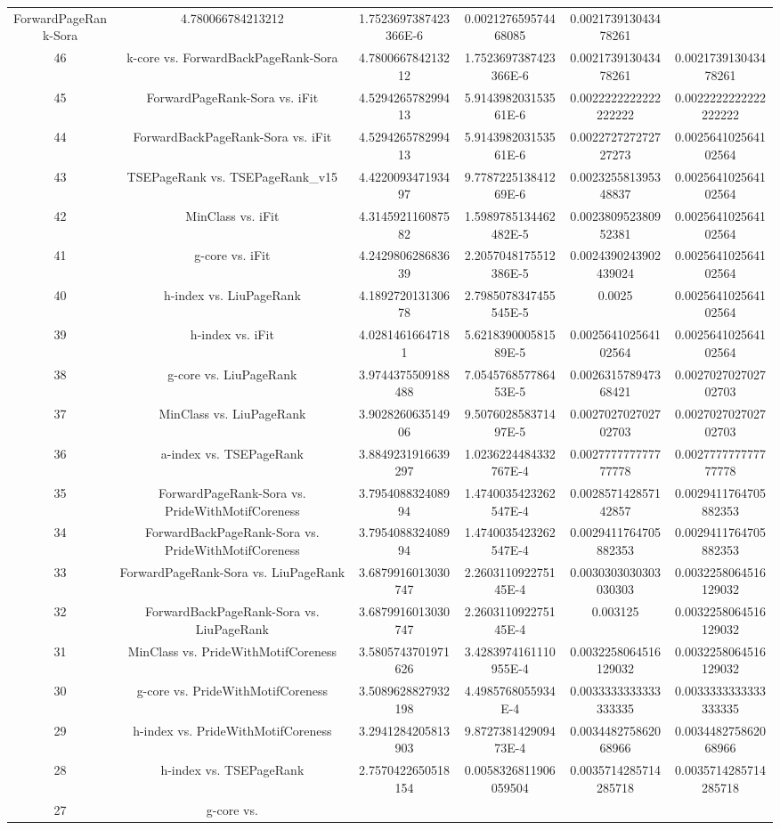 \documentclass[a4paper,10pt]{article}
\begin{document}
\begin{landscape}
\begin{table}[!htp]
\begin{tabular}{cccccc}
ForwardPageRank-Sora&4.780066784213212&1.7523697387423366E-6&0.002127659574468085&0.002173913043478261\\46&k-core vs. ForwardBackPageRank-Sora&4.780066784213212&1.7523697387423366E-6&0.002173913043478261&0.002173913043478261\\45&ForwardPageRank-Sora vs. iFit&4.529426578299413&5.914398203153561E-6&0.0022222222222222222&0.0022222222222222222\\44&ForwardBackPageRank-Sora vs. iFit&4.529426578299413&5.914398203153561E-6&0.002272727272727273&0.002564102564102564\\43&TSEPageRank vs. TSEPageRank_v15&4.422009347193497&9.778722513841269E-6&0.002325581395348837&0.002564102564102564\\42&MinClass vs. iFit&4.314592116087582&1.5989785134462482E-5&0.002380952380952381&0.002564102564102564\\41&g-core vs. iFit&4.242980628683639&2.2057048175512386E-5&0.0024390243902439024&0.002564102564102564\\40&h-index vs. LiuPageRank&4.189272013130678&2.7985078347455545E-5&0.0025&0.002564102564102564\\39&h-index vs. iFit&4.02814616647181&5.621839000581589E-5&0.002564102564102564&0.002564102564102564\\38&g-core vs. LiuPageRank&3.9744375509188488&7.054576857786453E-5&0.002631578947368421&0.002702702702702703\\37&MinClass vs. LiuPageRank&3.902826063514906&9.507602858371497E-5&0.002702702702702703&0.002702702702702703\\36&a-index vs. TSEPageRank&3.8849231916639297&1.0236224484332767E-4&0.002777777777777778&0.002777777777777778\\35&ForwardPageRank-Sora vs. PrideWithMotifCoreness&3.795408832408994&1.4740035423262547E-4&0.002857142857142857&0.0029411764705882353\\34&ForwardBackPageRank-Sora vs. PrideWithMotifCoreness&3.795408832408994&1.4740035423262547E-4&0.0029411764705882353&0.0029411764705882353\\33&ForwardPageRank-Sora vs. LiuPageRank&3.6879916013030747&2.260311092275145E-4&0.0030303030303030303&0.0032258064516129032\\32&ForwardBackPageRank-Sora vs. LiuPageRank&3.6879916013030747&2.260311092275145E-4&0.003125&0.0032258064516129032\\31&MinClass vs. PrideWithMotifCoreness&3.5805743701971626&3.4283974161110955E-4&0.0032258064516129032&0.0032258064516129032\\30&g-core vs. PrideWithMotifCoreness&3.5089628827932198&4.4985768055934E-4&0.0033333333333333335&0.0033333333333333335\\29&h-index vs. PrideWithMotifCoreness&3.2941284205813903&9.872738142909473E-4&0.003448275862068966&0.003448275862068966\\28&h-index vs. TSEPageRank&2.7570422650518154&0.0058326811906059504&0.0035714285714285718&0.0035714285714285718\\27&g-core vs. 
\end{tabular}
\end{table}
\end{landscape}
\end{document}
